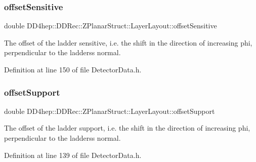 \hypertarget{struct_d_d4hep_1_1_d_d_rec_1_1_z_planar_struct_1_1_layer_layout_a80e60caf98db3f296a3d995e77c3f8c6}{}\label{struct_d_d4hep_1_1_d_d_rec_1_1_z_planar_struct_1_1_layer_layout_a80e60caf98db3f296a3d995e77c3f8c6} 
\subsubsection{\texorpdfstring{offset\+Sensitive}{offsetSensitive}}
{\footnotesize\ttfamily double D\+D4hep\+::\+D\+D\+Rec\+::\+Z\+Planar\+Struct\+::\+Layer\+Layout\+::offset\+Sensitive}



The offset of the ladder sensitive, i.\+e. the shift in the direction of increasing phi, perpendicular to the ladders\textquotesingle{}s normal. 



Definition at line 150 of file Detector\+Data.\+h.

\hypertarget{struct_d_d4hep_1_1_d_d_rec_1_1_z_planar_struct_1_1_layer_layout_ae19dff80b6c19640638709b1030f966e}{}\label{struct_d_d4hep_1_1_d_d_rec_1_1_z_planar_struct_1_1_layer_layout_ae19dff80b6c19640638709b1030f966e} 
\subsubsection{\texorpdfstring{offset\+Support}{offsetSupport}}
{\footnotesize\ttfamily double D\+D4hep\+::\+D\+D\+Rec\+::\+Z\+Planar\+Struct\+::\+Layer\+Layout\+::offset\+Support}



The offset of the ladder support, i.\+e. the shift in the direction of increasing phi, perpendicular to the ladders\textquotesingle{}s normal. 



Definition at line 139 of file Detector\+Data.\+h.

